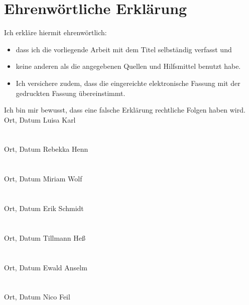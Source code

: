 \clearpage
\chapter*{Ehrenwörtliche Erklärung}	



Ich erkläre hiermit ehrenwörtlich: 

\begin{itemize}
	\item dass ich die vorliegende Arbeit mit dem Titel \textit{\DerTitelDerArbeit} selbständig verfasst und
	\item keine anderen als die angegebenen Quellen und Hilfsmittel benutzt habe. 
	\item Ich versichere zudem, dass die eingereichte elektronische Fassung mit der gedruckten Fassung übereinstimmt.
\end{itemize}
Ich bin mir bewusst, dass eine falsche Erklärung rechtliche Folgen haben wird.
\vspace{1cm}
\\
Ort, Datum \hfill Luisa Karl
\\
\\
\\
Ort, Datum \hfill Rebekka Henn
\\
\\
\\
Ort, Datum \hfill Miriam Wolf
\\
\\
\\
Ort, Datum \hfill Erik Schmidt
\\
\\
\\
Ort, Datum \hfill Tillmann Heß
\\
\\
\\
Ort, Datum \hfill Ewald Anselm
\\
\\
\\
Ort, Datum \hfill Nico Feil
 
